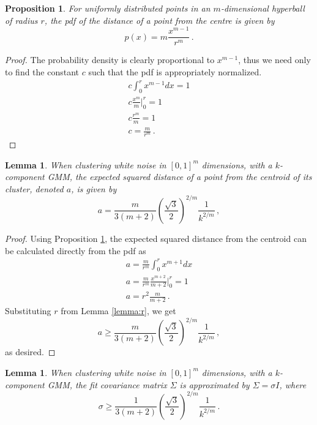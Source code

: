 \documentclass[a4paper,fleqn]{cas-sc}
\newtheorem{lemma}[theorem]{Lemma}
\newtheorem{proposition}{Proposition}
\theoremstyle{remark}
\begin{document}
\begin{proposition} \label{proposition:m-ball-pdf}
For uniformly distributed points in an $m$-dimensional hyperball of radius $r$, the pdf of the distance of a point from the centre is given by
\[
p(x) = m \frac{x^{m-1}}{r^m}\,.
\]
\end{proposition}
\begin{proof}
The probability density is clearly proportional to $x^{m-1}$, thus we need only to find the constant $c$ such that the pdf is appropriately normalized. 
\begin{gather*}
    c\int_{0}^r x^{m-1}dx = 1 \\
    c \frac{x^m}{m} \big |_0^r = 1\\
    c \frac{r^m}{m} = 1\\
    c = \frac{m}{r^m} \,.
\end{gather*}
\end{proof}

\begin{lemma} \label{lemma:a}
 When clustering white noise in $[0,1]^m$ dimensions, with a $k$-component GMM, the expected squared distance of a point from the centroid of its cluster, denoted $a$, is given by
 \begin{equation} \label{eq:a}
a = \frac{m}{3(m+2)}\left(\frac{\sqrt{3}}{2}\right)^{2/m}\frac{1}{k^{2/m}}\,,
\end{equation}
\end{lemma}
\begin{proof}
Using Proposition \ref{proposition:m-ball-pdf}, the expected squared distance from the centroid can be calculated directly from the pdf as
\begin{gather*}
    a = \frac{m}{r^m}\int_{0}^r x^{m+1}dx \\
    a = \frac{m}{r^m} \frac{x^{m+2}}{m+2} \big |_0^r = 1\\
    a = r^2\frac{m}{m+2}\,.
\end{gather*}
Substituting $r$ from Lemma \ref{lemma:r}, we get
\[
a \geq \frac{m}{3(m+2)}\left(\frac{\sqrt{3}}{2}\right)^{2/m}\frac{1}{k^{2/m}}\,,
\]
as desired.
\end{proof}

\begin{lemma} \label{lemma:variance}
When clustering white noise in $[0,1]^m$ dimensions, with a $k$-component GMM, the fit covariance matrix $\Sigma$ is approximated by $\Sigma = \sigma I$, where 
\[
\sigma \geq \frac{1}{3(m+2)}\left(\frac{\sqrt{3}}{2}\right)^{2/m}\frac{1}{k^{2/m}}\,.
\]
\end{lemma}
\end{document}
